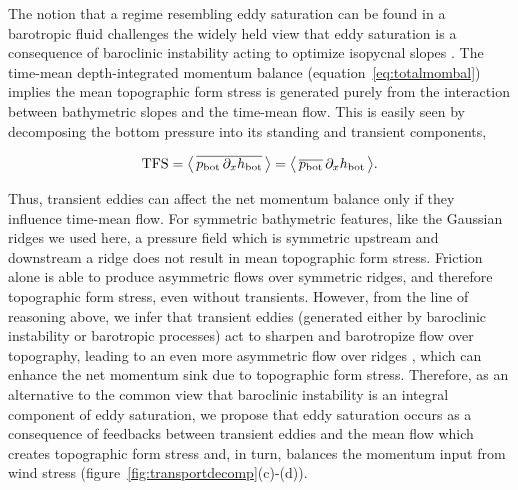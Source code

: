 \documentclass{agujournal2019}
\newcommand{\tfs} {\mathrm{TFS}}
\newcommand{\hb} {h_{\mathrm{bot}}}
\newcommand{\pb} {p_{\mathrm{bot}}}
\begin{document}
The notion that a regime resembling eddy saturation can be found in a barotropic fluid challenges the widely held view that eddy saturation is a consequence of baroclinic instability acting to optimize isopycnal slopes \cite{Straub-1993,Marshall-etal-2017}. The time-mean depth-integrated momentum balance (equation~\eqref{eq:totalmombal}) implies the mean topographic form stress is generated purely from the interaction between bathymetric slopes and the time-mean flow. This is easily seen by decomposing the bottom pressure into its standing and transient components, 
\vspace*{-0.2em}\begin{linenomath*}
\begin{equation}
\tfs = \big\langle\, \overline{\pb\,\partial_x{\hb}}\,\big\rangle = \big\langle\, \overline{\pb}\,\partial_x{\hb}\,\big\rangle.\vspace*{-0.2em}
\end{equation}
\end{linenomath*}
Thus, transient eddies can affect the net momentum balance only if they influence time-mean flow. For symmetric bathymetric features, like the Gaussian ridges we used here, a pressure field which is symmetric upstream and downstream a ridge does not result in mean topographic form stress. {\color{black}Friction alone is able to produce asymmetric flows over symmetric ridges, and therefore topographic form stress, even without transients. However, from the line of reasoning above}, we infer that transient eddies (generated either by baroclinic instability or barotropic processes) act to sharpen and barotropize flow over topography, leading to {\color{black}an even more} asymmetric flow over ridges \cite{Youngs-etal-2017}, which can enhance the net momentum sink due to topographic form stress.  Therefore, as an alternative to the common view that baroclinic instability is an integral component of eddy saturation, we propose that eddy saturation occurs as a consequence of feedbacks between transient eddies and the mean flow which creates topographic form stress and, in turn, balances the momentum input from wind stress (figure~\ref{fig:transportdecomp}\mbox{(c)-(d)}).
\end{document}
